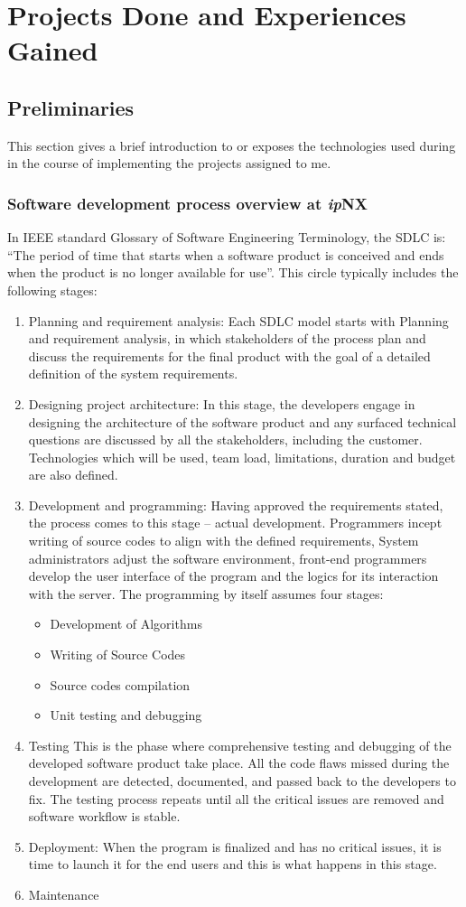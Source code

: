 \chapter{Projects Done and Experiences Gained}
\section{Preliminaries}
This section gives a brief introduction to or exposes the technologies used during in the course of implementing the projects assigned to me.
\subsection{Software development process overview at \textit{ip}NX}
In IEEE standard Glossary of Software Engineering
Terminology, the \ac{SDLC} is: “The period of time
that starts when a software product is conceived and ends
when the product is no longer available for use”. This circle typically includes the following stages:
\begin{enumerate}
	\item Planning and requirement analysis: Each \ac{SDLC} model starts with Planning and requirement analysis, in which stakeholders of the process plan and discuss the requirements for the final product with the goal of a detailed definition of the system requirements.
	\item Designing project architecture: In this stage, the developers engage in designing the architecture of the software product and any surfaced technical questions are discussed by all the stakeholders, including the customer. Technologies which will be used, team load, limitations, duration and budget are also defined.
	\item Development and programming: Having approved the requirements stated, the process comes to this stage – actual development. Programmers incept writing of source codes to align with the defined requirements, System administrators adjust the software environment, front-end programmers develop the user interface of the program and the logics for its interaction with the server. 
	The programming by itself assumes four stages:
	\begin{itemize}
		\item Development of Algorithms
		\item Writing of Source Codes
		\item Source codes compilation
		\item Unit testing and debugging
	\end{itemize}
	\item Testing This is the phase where comprehensive testing and debugging of the developed software product take place. All the code flaws missed during the development are detected, documented, and passed back to the developers to fix. The testing process repeats until all the critical issues are removed and software workflow is stable.
	\item Deployment: When the program is finalized and has no critical issues, it is time to launch it for the end users and this is what happens in this stage.
	\item Maintenance
\end{enumerate}

